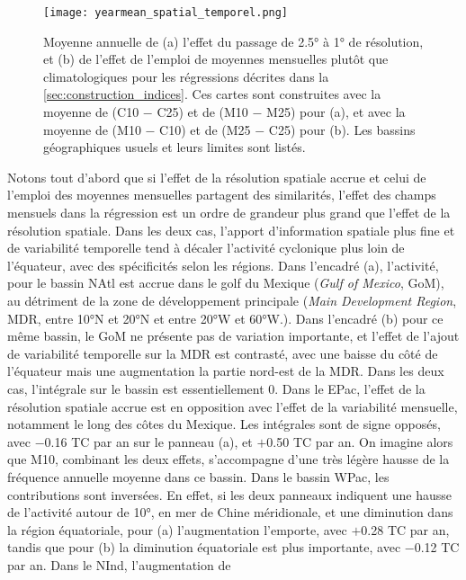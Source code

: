 \documentclass[../main.tex]{subfiles}
\begin{document}
\begin{figure}[tb]
    \centering
    \texttt{[image: yearmean\_spatial\_temporel.png]}
    \caption{Moyenne annuelle de (a) l'effet du passage de \ang{2.5} à \ang{1} de résolution, et (b) de l'effet de l'emploi de moyennes mensuelles plutôt que
    climatologiques pour les régressions décrites dans la \cref{sec:construction_indices}. Ces cartes sont construites avec la moyenne de (C10 $-$ C25) et de
    (M10 $-$ M25) pour (a), et avec la moyenne de (M10 $-$ C10) et de (M25 $-$ C25) pour (b). Les bassins géographiques usuels et leurs limites sont listés.}
    \label{fig:impact_spatial_temporel}
\end{figure}

Notons tout d'abord que si l'effet de la résolution spatiale accrue et celui de l'emploi des moyennes mensuelles partagent des similarités, l'effet des champs
mensuels dans la régression est un ordre de grandeur plus grand que l'effet de la résolution spatiale. Dans les deux cas, l'apport d'information spatiale plus
fine et de variabilité temporelle tend à décaler l'activité cyclonique plus loin de l'équateur, avec des spécificités selon les régions. Dans l'encadré (a),
l'activité, pour le bassin NAtl est accrue dans le golf du Mexique (\textit{Gulf of Mexico}, GoM), au détriment de la zone de développement
principale (\textit{Main Development Region}, MDR, entre \ang{10}N et \ang{20}N et entre \ang{20}W et \ang{60}W.). Dans l'encadré (b) pour ce même bassin, le
GoM ne présente pas de variation importante, et l'effet de l'ajout de variabilité temporelle sur la MDR est contrasté, avec une baisse du côté de l'équateur
mais une augmentation la partie nord-est de la MDR. Dans les deux cas, l'intégrale sur le bassin est essentiellement \num{0}. Dans le EPac, l'effet de la
résolution spatiale accrue est en opposition avec l'effet de la variabilité mensuelle, notamment le long des côtes du Mexique. Les intégrales sont de signe
opposés, avec \num{-0.16} TC par an sur le panneau (a), et $+$\num{0.50} TC par an. On imagine alors que M10, combinant les deux effets, s'accompagne d'une très
légère hausse de la fréquence annuelle moyenne dans ce bassin. Dans le bassin WPac, les contributions sont inversées. En effet, si les deux panneaux indiquent
une hausse de l'activité autour de \ang{10}, en mer de Chine méridionale, et une diminution dans la région équatoriale, pour (a) l'augmentation l'emporte, avec
$+$\num{0.28} TC par an, tandis que pour (b) la diminution équatoriale est plus importante, avec \num{-0.12} TC par an. Dans le NInd, l'augmentation de
\end{document}
